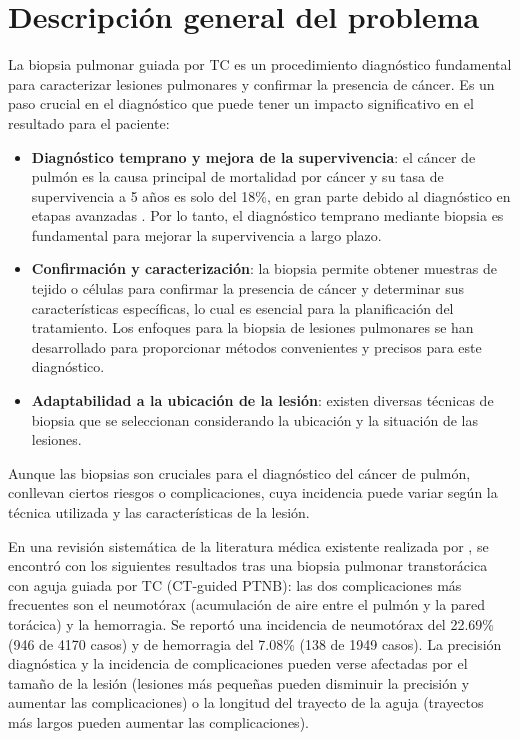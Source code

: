 \section{Descripción general del problema}
La biopsia pulmonar guiada por TC es un procedimiento diagnóstico fundamental para caracterizar lesiones pulmonares y confirmar la presencia de cáncer. Es un paso crucial en el diagnóstico que puede tener un impacto significativo en el resultado para el paciente: 
\begin{itemize}
    \item \textbf{Diagnóstico temprano y mejora de la supervivencia}: el cáncer de pulmón es la causa principal de mortalidad por cáncer y su tasa de supervivencia a 5 años es solo del 18\%, en gran parte debido al diagnóstico en etapas avanzadas \parencite{deng2018clinical}. Por lo tanto, el diagnóstico temprano mediante biopsia es fundamental para mejorar la supervivencia a largo plazo.
    \item \textbf{Confirmación y caracterización}: la biopsia permite obtener muestras de tejido o células para confirmar la presencia de cáncer y determinar sus características específicas, lo cual es esencial para la planificación del tratamiento. Los enfoques para la biopsia de lesiones pulmonares se han desarrollado para proporcionar métodos convenientes y precisos para este diagnóstico.
    \item \textbf{Adaptabilidad a la ubicación de la lesión}: existen diversas técnicas de biopsia que se seleccionan considerando la ubicación y la situación de las lesiones. 
\end{itemize} 

Aunque las biopsias son cruciales para el diagnóstico del cáncer de pulmón, conllevan ciertos riesgos o complicaciones, cuya incidencia puede variar según la técnica utilizada y las características de la lesión. 

En una revisión sistemática de la literatura médica existente realizada por \cite{deng2018clinical}, se encontró con los siguientes resultados tras una biopsia pulmonar transtorácica con aguja guiada por TC (CT-guided PTNB): las dos complicaciones más frecuentes son el neumotórax (acumulación de aire entre el pulmón y la pared torácica) y la hemorragia. Se reportó una incidencia de neumotórax del 22.69\% (946 de 4170 casos) y de hemorragia del 7.08\% (138 de 1949 casos). 
La precisión diagnóstica y la incidencia de complicaciones pueden verse afectadas por el tamaño de la lesión (lesiones más pequeñas pueden disminuir la precisión y aumentar las complicaciones) o la longitud del trayecto de la aguja (trayectos más largos pueden aumentar las complicaciones).



